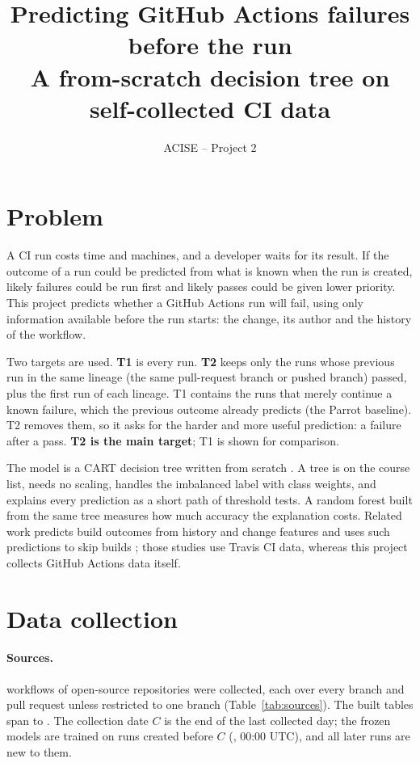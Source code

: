\documentclass[11pt,a4paper]{article}
\title{Predicting GitHub Actions failures before the run\\[0.3em]
\large A from-scratch decision tree on self-collected CI data}
\author{ACISE -- Project 2}
\date{}
\begin{document}
\maketitle

\section{Problem}

A CI run costs time and machines, and a developer waits for its result. If the
outcome of a run could be predicted from what is known when the run is created,
likely failures could be run first and likely passes could be given lower priority.
This project predicts whether a GitHub Actions run will fail, using only
information available before the run starts: the change, its author and the
history of the workflow.

Two targets are used. \textbf{T1} is every run. \textbf{T2} keeps only the runs
whose previous run in the same lineage (the same pull-request branch or pushed
branch) passed, plus the first run of each lineage. T1 contains the runs that
merely continue a known failure, which the previous outcome already predicts
(the Parrot baseline). T2 removes them, so it asks for the harder and more useful
prediction: a failure after a pass. \textbf{T2 is the main target}; T1 is shown
for comparison.

The model is a CART decision tree written from scratch \cite{breiman1984cart}. A
tree is on the course list, needs no scaling, handles the imbalanced label with
class weights, and explains every prediction as a short path of threshold tests.
A random forest built from the same tree measures how much accuracy the
explanation costs. Related work predicts build outcomes from history and change
features \cite{hassan2017esem,chen2020buildfast,saidani2020ist} and uses such
predictions to skip builds \cite{jin2020icse}; those studies use Travis CI data,
whereas this project collects GitHub Actions data itself.

\section{Data collection}

\paragraph{Sources.} \NSources{} workflows of \NRepos{} open-source repositories
were collected, each over every branch and pull request unless restricted to one
branch (Table~\ref{tab:sources}). The built tables span \WindowStart{} to
\WindowEnd{}. The collection date $C$ is the end of the last collected day; the
frozen models are trained on runs created before $C$ (\Cutoff{}, 00:00 UTC), and
all later runs are new to them.
\end{document}
